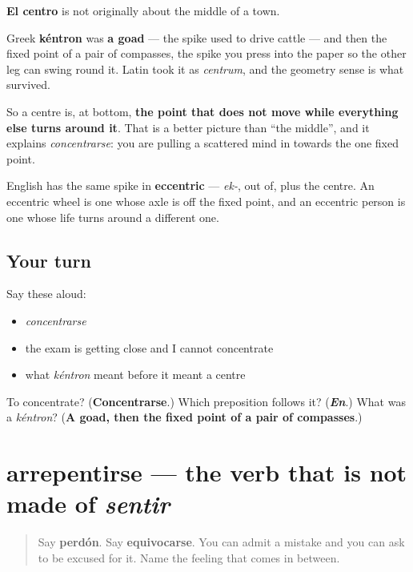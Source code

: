 \begin{culture}
\textbf{El centro} is not originally about the middle of a town.

Greek \textbf{kéntron} was \textbf{a goad} — the spike used to drive cattle — and then the fixed point of a pair of compasses, the spike you press into the paper so the other leg can swing round it. Latin took it as \emph{centrum}, and the geometry sense is what survived.

So a centre is, at bottom, \textbf{the point that does not move while everything else turns around it}. That is a better picture than \textquotedblleft{}the middle\textquotedblright{}, and it explains \emph{concentrarse}: you are pulling a scattered mind in towards the one fixed point.

English has the same spike in \textbf{eccentric} — \emph{ek-}, out of, plus the centre. An eccentric wheel is one whose axle is off the fixed point, and an eccentric person is one whose life turns around a different one.
\end{culture}

\subsection*{Your turn}
Say these aloud:

\begin{itemize}
\raggedright
  \item \emph{concentrarse}
  \item the exam is getting close and I cannot concentrate
  \item what \emph{kéntron} meant before it meant a centre
\end{itemize}

\begin{tcolorbox}[breakable,colback=teal!4,colframe=teal!35!black,title={Before you move on}]
To concentrate? (\textbf{Concentrarse}.) Which preposition follows it? (\emph{\textbf{En}}.) What was a \emph{kéntron}? (\textbf{A goad, then the fixed point of a pair of compasses}.)
\end{tcolorbox}
\section[arrepentirse]{arrepentirse — the verb that is not made of \emph{sentir}}

\label{lesson:ES-C443-arrepentirse}



\begin{quote}
Say \textbf{perdón}. Say \textbf{equivocarse}. You can admit a mistake and you can ask to be excused for it. Name the feeling that comes in between.
\end{quote}

